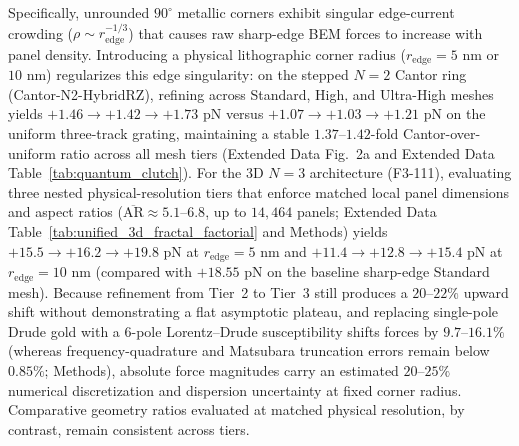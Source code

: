 \documentclass[11pt, a4paper]{article}
\begin{document}
Specifically, unrounded $90^\circ$ metallic corners exhibit singular edge-current crowding ($\rho \sim r_{\mathrm{edge}}^{-1/3}$) that causes raw sharp-edge BEM forces to increase with panel density. Introducing a physical lithographic corner radius ($r_{\mathrm{edge}}=5\text{ nm}$ or $10\text{ nm}$) regularizes this edge singularity: on the stepped $N=2$ Cantor ring (Cantor-N2-HybridRZ), refining across Standard, High, and Ultra-High meshes yields $+1.46 \to +1.42 \to +1.73\text{ pN}$ versus $+1.07 \to +1.03 \to +1.21\text{ pN}$ on the uniform three-track grating, maintaining a stable $1.37\text{--}1.42$-fold Cantor-over-uniform ratio across all mesh tiers (Extended Data Fig.~2a and Extended Data Table~\ref{tab:quantum_clutch}). For the 3D $N=3$ architecture (F3-111), evaluating three nested physical-resolution tiers that enforce matched local panel dimensions and aspect ratios ($\overline{\mathrm{AR}} \approx 5.1\text{--}6.8$, up to $14{,}464$ panels; Extended Data Table~\ref{tab:unified_3d_fractal_factorial} and Methods) yields $+15.5 \to +16.2 \to +19.8\text{ pN}$ at $r_{\mathrm{edge}}=5\text{ nm}$ and $+11.4 \to +12.8 \to +15.4\text{ pN}$ at $r_{\mathrm{edge}}=10\text{ nm}$ (compared with $+18.55\text{ pN}$ on the baseline sharp-edge Standard mesh). Because refinement from Tier~2 to Tier~3 still produces a $20\text{--}22\%$ upward shift without demonstrating a flat asymptotic plateau, and replacing single-pole Drude gold with a 6-pole Lorentz--Drude susceptibility\cite{rakic1998} shifts forces by $9.7\text{--}16.1\%$ (whereas frequency-quadrature and Matsubara truncation errors remain below $0.85\%$; Methods), absolute force magnitudes carry an estimated $20\text{--}25\%$ numerical discretization and dispersion uncertainty at fixed corner radius. Comparative geometry ratios evaluated at matched physical resolution, by contrast, remain consistent across tiers.
\end{document}
